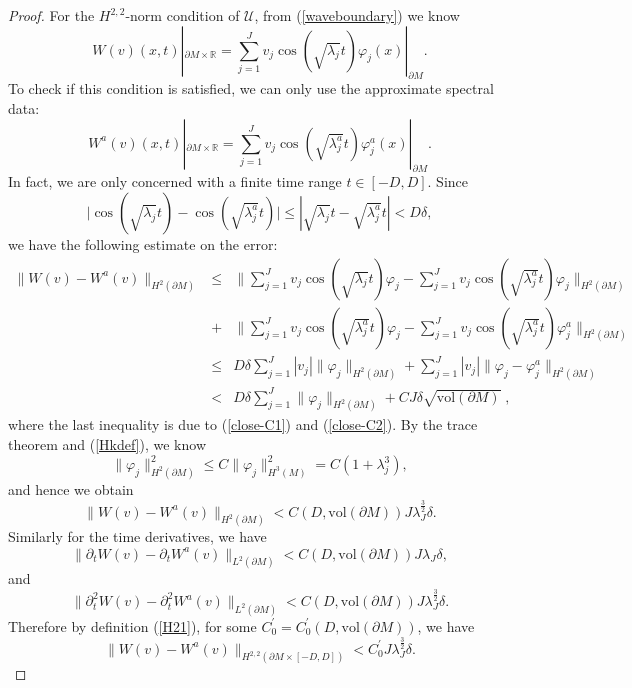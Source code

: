 \documentclass[11pt,letterpaper]{amsart}
\numberwithin{equation}{section}
\theoremstyle{definition}
\theoremstyle{plain}
\theoremstyle{definition}
\theoremstyle{plain}
\theoremstyle{definition}
\theoremstyle{plain}
\newcommand{\vol}{\textrm{vol}}
\begin{document}
\begin{proof}
For the $H^{2,2}$-norm condition of $\mathcal{U}$, from (\ref{waveboundary}) we know
$$
W(v)(x,t)|_{\partial M\times \mathbb{R}}= \sum_{j=1}^{J} v_j \cos(\sqrt{\lambda_j} t) \varphi_j(x)|_{\partial M}. 
$$
To check if this condition is satisfied, we can only use the approximate spectral data:
$$W^a (v)(x,t)|_{\partial M\times \mathbb{R}}= \sum_{j=1}^{J} v_j \cos(\sqrt{\lambda^a_j} t) \varphi_j^a(x)|_{\partial M}. $$
In fact, we are only concerned with a finite time range $t\in [-D,D]$. Since 
$$\big|\cos(\sqrt{\lambda_j} t)-\cos(\sqrt{\lambda_j^a} t)\big|\leqslant |\sqrt{\lambda_j} t-\sqrt{\lambda_j^a} t| <D \delta,$$
we have the following estimate on the error:
\begin{eqnarray*}
\|W(v)-W^a(v)\|_{H^2(\partial M)} &\leqslant& \|\sum_{j=1}^{J} v_j \cos(\sqrt{\lambda_j} t) \varphi_j-\sum_{j=1}^{J} v_j \cos(\sqrt{\lambda_j^a} t) \varphi_j\|_{H^2(\partial M)} \\
&+& \|\sum_{j=1}^{J} v_j \cos(\sqrt{\lambda_j^a} t) \varphi_j-\sum_{j=1}^{J} v_j \cos(\sqrt{\lambda_j^a} t) \varphi_j^a\|_{H^2(\partial M)} \\
&\leqslant&  D\delta \sum_{j=1}^{J}|v_j|\|\varphi_j\|_{H^2(\partial M)}+ \sum_{j=1}^{J} |v_j|\|\varphi_j-\varphi_j^a\|_{H^2(\partial M)} \\
&<& D\delta \sum_{j=1}^{J}\|\varphi_j\|_{H^2(\partial M)} +CJ\delta \sqrt{\vol(\partial M)}\; ,
\end{eqnarray*}
where the last inequality is due to (\ref{close-C1}) and (\ref{close-C2}). By the trace theorem and (\ref{Hkdef}), we know
$$\|\varphi_j\|_{H^2(\partial M)}^2\leqslant C\|\varphi_j\|_{H^3(M)}^2=C(1+\lambda_j^3),$$
and hence we obtain
\begin{equation*}
\|W(v)-W^a(v)\|_{H^2(\partial M)} < C(D,\vol(\partial M))J\lambda_{J}^{\frac{3}{2}}\delta.
\end{equation*}
Similarly for the time derivatives, we have
\begin{equation*}
\|\partial_t W(v)-\partial_t W^a(v)\|_{L^2(\partial M)} < C(D,\vol(\partial M))J\lambda_{J}\delta,
\end{equation*}
and 
$$\|\partial_t^2 W(v)-\partial_t^2 W^a(v)\|_{L^2(\partial M)} < C(D,\vol(\partial M))J\lambda_{J}^{\frac{3}{2}}\delta.$$
Therefore by definition (\ref{H21}), for some $C_0^{\prime}=C_0^{\prime}(D,\vol(\partial M))$, we have
\begin{equation}\label{H21error}
\|W(v)-W^a(v)\|_{H^{2,2}(\partial M\times [-D,D])}< C_0^{\prime}J\lambda_{J}^{\frac{3}{2}}\delta.
\end{equation}


\end{proof}
\end{document}
